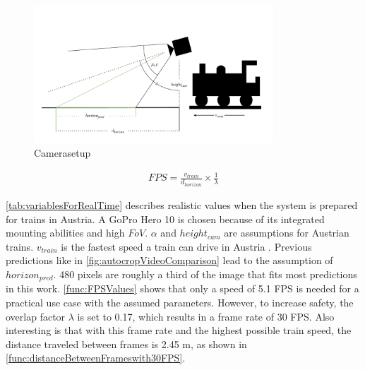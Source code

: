 \begin{figure}[H]
    \centering
    \includegraphics[width=0.8\textwidth]{PICs/discussion/Kameraaufbau.pdf}
    \caption{Camerasetup}
    \label{fig:cameraSetup}
\end{figure}

\begin{align}
    FPS = \frac{v_{train}}{d_{horizon}} \times \frac{1}{\lambda}
    \label{func:RealTime}
\end{align}

\autoref{tab:variablesForRealTime} describes realistic values when the system is prepared for trains in Austria.
A GoPro Hero 10 \cite{goproHero10} is chosen because of its integrated mounting abilities and high $FoV$.
$\alpha$ and $height_{cam}$ are assumptions for Austrian trains.
$v_{train}$ is the fastest speed a train can drive in Austria \cite{geschwindigkeitZugAustria}.
Previous predictions like in \autoref{fig:autocropVideoComparison} lead to the assumption of $horizon_{pred}$.
480 pixels are roughly a third of the image that fits most predictions in this work.
\autoref{func:FPSValues} shows that only a speed of 5.1 \ac{FPS} is needed for a practical use case with the assumed parameters.
However, to increase safety, the overlap factor $\lambda$ is set to 0.17, which results in a frame rate of 30 \ac{FPS}.
Also interesting is that with this frame rate and the highest possible train speed, the distance traveled between frames is 2.45 m, as shown in \autoref{func:distanceBetweenFrameswith30FPS}.


